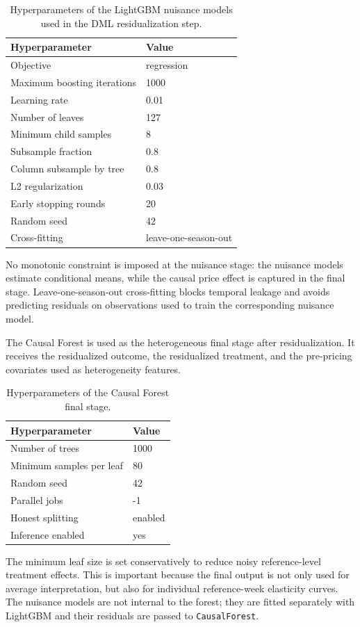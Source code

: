 \begin{table}[h]
\centering
\small
\begin{tabular}{ll}
\toprule
\textbf{Hyperparameter} & \textbf{Value} \\
\midrule
Objective & regression \\
Maximum boosting iterations & 1000 \\
Learning rate & 0.01 \\
Number of leaves & 127 \\
Minimum child samples & 8 \\
Subsample fraction & 0.8 \\
Column subsample by tree & 0.8 \\
L2 regularization & 0.03 \\
Early stopping rounds & 20 \\
Random seed & 42 \\
Cross-fitting & leave-one-season-out \\
\bottomrule
\end{tabular}
\caption{Hyperparameters of the LightGBM nuisance models used in the DML residualization step.}
\label{tab:dml-hyperparams}
\end{table}

No monotonic constraint is imposed at the nuisance stage: the nuisance models estimate conditional means, while the causal price effect is captured in the final stage. Leave-one-season-out cross-fitting blocks temporal leakage and avoids predicting residuals on observations used to train the corresponding nuisance model.

The Causal Forest is used as the heterogeneous final stage after residualization. It receives the residualized outcome, the residualized treatment, and the pre-pricing covariates used as heterogeneity features.

\begin{table}[h]
\centering
\small
\begin{tabular}{ll}
\toprule
\textbf{Hyperparameter} & \textbf{Value} \\
\midrule
Number of trees & 1000 \\
Minimum samples per leaf & 80 \\
Random seed & 42 \\
Parallel jobs & -1 \\
Honest splitting & enabled \\
Inference enabled & yes \\
\bottomrule
\end{tabular}
\caption{Hyperparameters of the Causal Forest final stage.}
\label{tab:cf-hyperparams}
\end{table}

The minimum leaf size is set conservatively to reduce noisy reference-level treatment effects. This is important because the final output is not only used for average interpretation, but also for individual reference-week elasticity curves. The nuisance models are not internal to the forest; they are fitted separately with LightGBM and their residuals are passed to \texttt{CausalForest}.
